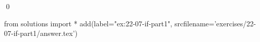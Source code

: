 
\begin{ex}
  \label{ex:22-07-if-part1}
  
  \qed
\end{ex}
\begin{python0}
from solutions import *
add(label="ex:22-07-if-part1",
    srcfilename='exercises/22-07-if-part1/answer.tex')
\end{python0}
